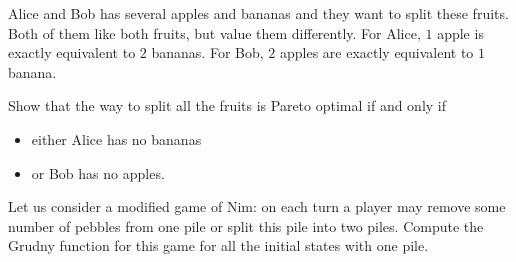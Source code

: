 \documentclass[addpoints,answers]{exam}
\begin{document}
    \pagestyle{headandfoot}
    \runningheadrule

    \firstpagefooter{}{}{}
    \runningfooter{}{}{}
    \begin{flushright}

        \vspace{0.2in}

    \end{flushright}

    \begin{questions}
        \question
            Alice and Bob has several apples and bananas and they want to split these
            fruits. Both of them like both fruits, but value them differently. For Alice,
            $1$ apple is exactly equivalent to $2$ bananas. For Bob, $2$ apples are exactly
            equivalent to $1$ banana.
            
            Show that the way to split all the fruits is Pareto optimal if and only if
            \begin{itemize}
                \item either Alice has no bananas
                \item or Bob has no apples.
            \end{itemize}
            \begin{solutionorbox}[\stretch{1}]
            \end{solutionorbox}
            \newpage
 
        \question
            Let us consider a modified game of Nim: on each turn a player may remove some
            number of pebbles from one pile or split this pile into two piles. Compute the
            Grudny function for this game for all the initial states with one pile.
            \begin{solutionorbox}[\stretch{1}]
            \end{solutionorbox}
            \newpage
 
\end{questions}
\end{document}
